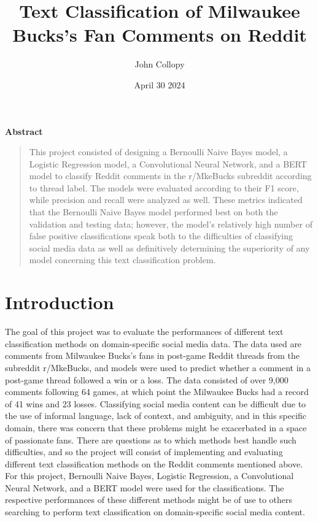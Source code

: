 \documentclass[twocolumn]{article}
\title{Text Classification of Milwaukee Bucks's Fan Comments on Reddit}
\author{John Collopy}
\date{April 30 2024}
\begin{document}
\maketitle


\begin{center}
\textbf{Abstract}
\end{center}

\begin{quote}
This project consisted of designing a Bernoulli Naive Bayes model, a Logistic Regression model, a Convolutional Neural Network, and a BERT model to classify Reddit comments in the r/MkeBucks subreddit according to thread label. The models were evaluated according to their F1 score, while precision and recall were analyzed as well. These metrics indicated that the Bernoulli Naive Bayes model performed best on both the validation and testing data; however, the model's relatively high number of false positive classifications speak both to the difficulties of classifying social media data as well as definitively determining the superiority of any model concerning this text classification problem.
\end{quote}

\section{Introduction}

The goal of this project was to evaluate the performances of different text classification methods on domain-specific social media data. The data used are comments from Milwaukee Bucks's fans in post-game Reddit threads from the subreddit r/MkeBucks, and models were used to predict whether a comment in a post-game thread followed a win or a loss. The data consisted of over 9,000 comments following 64 games, at which point the Milwaukee Bucks had a record of 41 wins and 23 losses. Classifying social media content can be difficult due to the use of informal language, lack of context, and ambiguity, and in this specific domain, there was concern that these problems might be exacerbated in a space of passionate fans. There are questions as to which methods best handle such difficulties, and so the project will consist of implementing and evaluating different text classification methods on the Reddit comments mentioned above. For this project, Bernoulli Naive Bayes, Logistic Regression, a Convolutional Neural Network, and a BERT model were used for the classifications. The respective performances of these different methods might be of use to others searching to perform text classification on domain-specific social media content.
\end{document}
